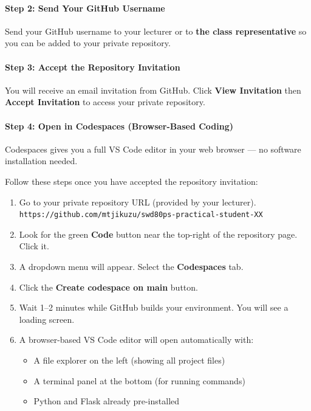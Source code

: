 \documentclass[12pt,a4paper]{article}
\begin{document}
\paragraph{Step 2: Send Your GitHub Username}
Send your GitHub username to your lecturer or to \textbf{the class representative} so you can be added to your private repository.

\paragraph{Step 3: Accept the Repository Invitation}
You will receive an email invitation from GitHub. Click \textbf{View Invitation} then \textbf{Accept Invitation} to access your private repository.

\paragraph{Step 4: Open in Codespaces (Browser-Based Coding)}
Codespaces gives you a full VS Code editor in your web browser --- no software installation needed.

Follow these steps once you have accepted the repository invitation:

\begin{enumerate}
  \item Go to your private repository URL (provided by your lecturer).\newline
        \texttt{https://github.com/mtjikuzu/swd80ps-practical-student-XX}
  \item Look for the green \textbf{Code} button near the top-right of the repository page. Click it.
  \item A dropdown menu will appear. Select the \textbf{Codespaces} tab.
  \item Click the \textbf{Create codespace on main} button.
  \item Wait 1--2 minutes while GitHub builds your environment. You will see a loading screen.
  \item A browser-based VS Code editor will open automatically with:
        \begin{itemize}
          \item A file explorer on the left (showing all project files)
          \item A terminal panel at the bottom (for running commands)
          \item Python and Flask already pre-installed
        \end{itemize}
\end{enumerate}
\end{document}
